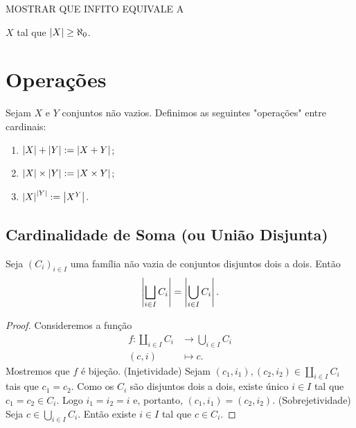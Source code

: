 	MOSTRAR QUE INFITO EQUIVALE A

$X$ tal que $\left\vert{X}\right\vert \geq \aleph_0$.

\section{Operações}

\begin{defi}
	Sejam $X$ e $Y$ conjuntos não vazios. Definimos as seguintes "operações" entre cardinais:
	\begin{enumerate}
	\item $\left\vert{X}\right\vert + \left\vert{Y}\right\vert := \left\vert{X + Y}\right\vert$;
	\item $\left\vert{X}\right\vert \times \left\vert{Y}\right\vert := \left\vert{X \times Y}\right\vert$;
	\item $\left\vert{X}\right\vert^{\left\vert{Y}\right\vert} := \left\vert{X^Y}\right\vert$.
	\end{enumerate}
\end{defi}

\subsection{Cardinalidade de Soma (ou União Disjunta)}

\begin{prop}
\label{conj:prop.un.dis}
Seja $(C_i)_{i \in I}$ uma família não vazia de conjuntos disjuntos dois a dois. Então
	\begin{equation*}
	\left\vert{\bigsqcup_{i \in I} C_i}\right\vert = \left\vert{\bigcup_{i \in I} C_i}\right\vert.
	\end{equation*}
\end{prop}
\begin{proof}
Consideremos a função
	\begin{align*}
	f: \coprod_{i \in I} C_i &\to \bigcup_{i \in I} C_i \\
			(c,i) &\mapsto c.
	\end{align*}
Mostremos que $f$ é bijeção. (Injetividade) Sejam $(c_1,i_1),(c_2,i_2) \in \coprod_{i \in I} C_i$ tais que $c_1=c_2$. Como os $C_i$ são disjuntos dois a dois, existe único $i \in I$ tal que $c_1=c_2 \in C_i$. Logo $i_1=i_2=i$ e, portanto, $(c_1,i_1)=(c_2,i_2)$. (Sobrejetividade) Seja $c \in \bigcup_{i \in I} C_i$. Então existe $i \in I$ tal que $c \in C_i$.
\end{proof}

